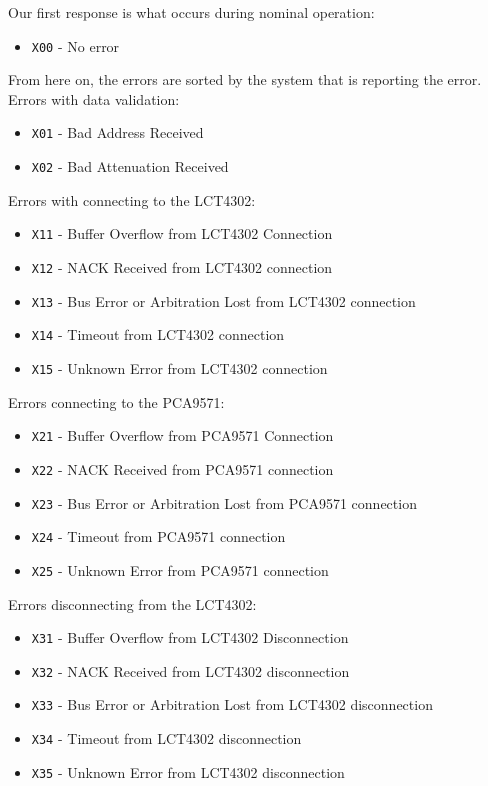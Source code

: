Our first response is what occurs during nominal operation:
\begin{itemize}
    \item \texttt{X00} - No error
\end{itemize}
From here on, the errors are sorted by the system that is reporting the error.
Errors with data validation:
\begin{itemize}
    \item \texttt{X01} - Bad Address Received
    \item \texttt{X02} - Bad Attenuation Received
\end{itemize}
Errors with connecting to the LCT4302:
\begin{itemize}
    \item \texttt{X11} - Buffer Overflow from LCT4302 Connection
    \item \texttt{X12} - NACK Received from LCT4302 connection
    \item \texttt{X13} - Bus Error or Arbitration Lost from LCT4302 connection
    \item \texttt{X14} - Timeout from LCT4302 connection
    \item \texttt{X15} - Unknown Error from LCT4302 connection
\end{itemize}
Errors connecting to the PCA9571:
\begin{itemize}
    \item \texttt{X21} - Buffer Overflow from PCA9571 Connection
    \item \texttt{X22} - NACK Received from PCA9571 connection
    \item \texttt{X23} - Bus Error or Arbitration Lost from PCA9571 connection
    \item \texttt{X24} - Timeout from PCA9571 connection
    \item \texttt{X25} - Unknown Error from PCA9571 connection
\end{itemize}
Errors disconnecting from the LCT4302:
\begin{itemize}
    \item \texttt{X31} - Buffer Overflow from LCT4302 Disconnection
    \item \texttt{X32} - NACK Received from LCT4302 disconnection
    \item \texttt{X33} - Bus Error or Arbitration Lost from LCT4302 disconnection
    \item \texttt{X34} - Timeout from LCT4302 disconnection
    \item \texttt{X35} - Unknown Error from LCT4302 disconnection
\end{itemize}